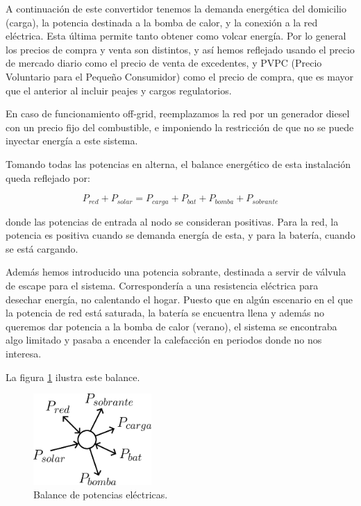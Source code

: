 A continuación de este convertidor tenemos la demanda energética del domicilio
(carga), la potencia destinada a la bomba de calor, y la conexión a la red
eléctrica. Esta última permite tanto obtener como volcar energía. Por lo
general los precios de compra y venta son distintos, y así hemos reflejado
usando el precio de mercado diario como el precio de venta de excedentes, y
PVPC (Precio Voluntario para el Pequeño Consumidor) como el precio de compra,
que es mayor que el anterior al incluir peajes y cargos regulatorios.

En caso de funcionamiento off-grid, reemplazamos la red por un generador
diesel con un precio fijo del combustible, e imponiendo la restricción de que
no se puede inyectar energía a este sistema.

Tomando todas las potencias en alterna, el balance energético de esta
instalación queda reflejado por:

\begin{equation} \label{eq:power_balance}
	P_{red} + P_{solar} = P_{carga} + P_{bat} + P_{bomba} + P_{sobrante}
\end{equation}

donde las potencias de entrada al nodo se consideran positivas. Para la red, la
potencia es positiva cuando se demanda energía de esta, y para la batería,
cuando se está cargando.

Además hemos introducido una potencia sobrante, destinada a servir de válvula
de escape para el sistema. Correspondería a una resistencia eléctrica para
desechar energía, no calentando el hogar. Puesto que en algún escenario en el
que la potencia de red está saturada, la batería se encuentra llena y además no
queremos dar potencia a la bomba de calor (verano), el sistema se encontraba
algo limitado y pasaba a encender la calefacción en periodos donde no nos
interesa.

La figura \ref{fig:electric_node} ilustra este balance.

\begin{figure}[h] \centering
	\centering
	\includegraphics[width=0.4\textwidth]{./capitulos/resultados_discusion/images/electric_node.png}
	\caption{Balance de potencias eléctricas.}
	\label{fig:electric_node}
\end{figure}

